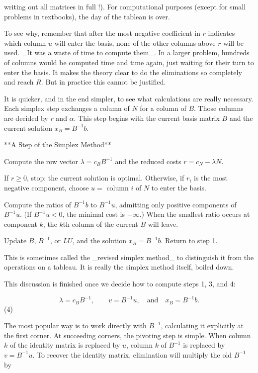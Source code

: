writing out all matrices in full !). For computational purposes (except for small problems in textbooks), the day of the tableau is over.

To see why, remember that after the most negative coefficient in \(r\) indicates which column \(u\) will enter the basis, none of the other columns above \(r\) will be used. _It was a waste of time to compute them_. In a larger problem, hundreds of columns would be computed time and time again, just waiting for their turn to enter the basis. It makes the theory clear to do the eliminations so completely and reach \(R\). But in practice this cannot be justified.

It is quicker, and in the end simpler, to see what calculations are really necessary. Each simplex step exchanges a column of \(N\) for a column of \(B\). Those columns are decided by \(r\) and \(\alpha\). This step begins with the current basis matrix \(B\) and the current solution \(x_{B}=B^{-1}b\).

**A Step of the Simplex Method**

Compute the row vector \(\lambda=c_{B}B^{-1}\) and the reduced costs \(r=c_{N}-\lambda N\).

If \(r\geq 0\), stop: the current solution is optimal. Otherwise, if \(r_{i}\) is the most negative component, choose \(u=\) column \(i\) of \(N\) to enter the basis.

Compute the ratios of \(B^{-1}b\) to \(B^{-1}u\), admitting only positive components of \(B^{-1}u\). (If \(B^{-1}u<0\), the minimal cost is \(-\infty\).) When the smallest ratio occurs at component \(k\), the \(k\)th column of the current \(B\) will leave.

Update \(B\), \(B^{-1}\), or \(LU\), and the solution \(x_{B}=B^{-1}b\). Return to step 1.

This is sometimes called the _revised simplex method_ to distinguish it from the operations on a tableau. It is really the simplex method itself, boiled down.

This discussion is finished once we decide how to compute steps 1, 3, and 4:

\[\lambda=c_{B}B^{-1},\qquad v=B^{-1}u,\quad\text{and}\quad x_{B}=B^{-1}b.\] (4)

The most popular way is to work directly with \(B^{-1}\), calculating it explicitly at the first corner. At succeeding corners, the pivoting step is simple. When column \(k\) of the identity matrix is replaced by \(u\), column \(k\) of \(B^{-1}\) is replaced by \(v=B^{-1}u\). To recover the identity matrix, elimination will multiply the old \(B^{-1}\) by

